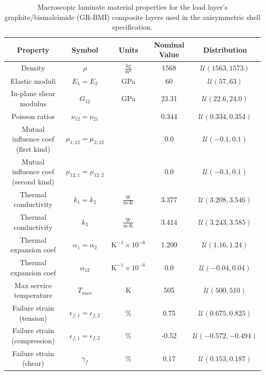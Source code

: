 \documentclass{article}
\begin{document}
\begin{table}
\caption[Gr-BMI material properties]{Macroscopic laminate material properties for the load layer's graphite/bismaleimide (GR-BMI) composite layers used in the axisymmetric shell specification.}
\label{tab:matPropGR-BMI}
\begin{center}
\begin{tabular}[]{ c | c | c | c | c }
\textbf{Property} & \textbf{Symbol} & \textbf{Units} & \textbf{Nominal Value} & \textbf{Distribution} \\ \hline
Density & $\rho$ & $\frac{\textrm{kg}}{\textrm{m}^3}$ & 1568 & $\mathcal{U}(1563,1573)$ \\ \hline
Elastic moduli & $E_{1} = E_{2}$ & GPa & 60 & $\mathcal{U}(57,63)$ \\ \hline
In-plane shear modulus & $G_{12}$ & GPa & 23.31 & $\mathcal{U}(22.6,24.0)$ \\ \hline
Poisson ratios & $\nu_{12} = \nu_{21}$ & & 0.344 & $\mathcal{U}(0.334,0.354)$\\ \hline
Mutual influence coef (first kind) & $\mu_{1,12} = \mu_{2,12}$ & & 0.0 & $\mathcal{U}(-0.1,0.1)$ \\ \hline
Mutual influence coef (second kind) & $\mu_{12,1} = \mu_{12,2}$ & & 0.0 & $\mathcal{U}(-0.1,0.1)$ \\ \hline
Thermal conductivity & $k_{1} = k_{2}$ & $\frac{\textrm{W}}{\textrm{m-K}}$ & 3.377 & $\mathcal{U}(3.208,3.546)$ \\ \hline
Thermal conductivity & $k_{3}$ & $\frac{\textrm{W}}{\textrm{m-K}}$ & 3.414 & $\mathcal{U}(3.243,3.585)$ \\ \hline
Thermal expansion coef & $\alpha_{1} = \alpha_{2}$ & $\textrm{K}^{-1} \times 10^{-6}$ & 1.200 & $\mathcal{U}(1.16,1.24)$ \\ \hline
Thermal expansion coef & $\alpha_{12}$ & $\textrm{K}^{-1} \times 10^{-6}$ & 0.0 & $\mathcal{U}(-0.04,0.04)$ \\ \hline \hline
Max service temperature & $T_{max}$ & K & 505 & $\mathcal{U}(500,510)$ \\ \hline
Failure strain (tension) & $\epsilon_{f,1} = \epsilon_{f,2}$ & \% & 0.75 & $\mathcal{U}(0.675,0.825)$ \\ \hline
Failure strain (compression) & $\epsilon_{f,1} = \epsilon_{f,2}$ & \% & -0.52 & $\mathcal{U}(-0.572,-0.494)$ \\ \hline
Failure strain (shear) & $\gamma_{f}$ & \% & 0.17 & $\mathcal{U}(0.153,0.187)$ \\ \hline
\end{tabular}
\end{center}
\end{table}
\end{document}

